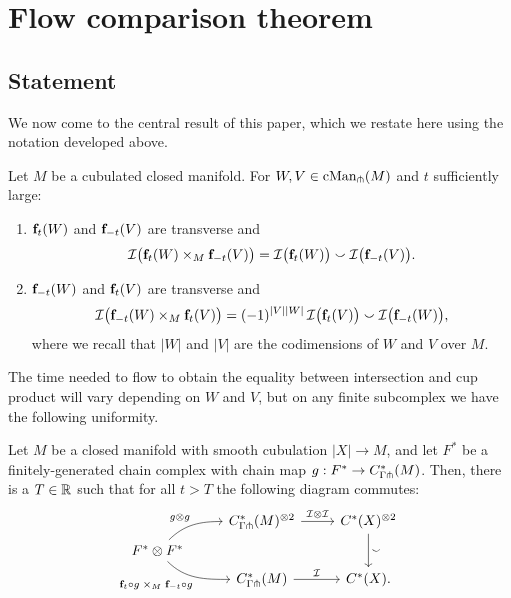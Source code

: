 
\section{Flow comparison theorem}\label{S: flow comparison theorem}

\subsection{Statement}

We now come to the central result of this paper, which we restate here using the notation developed above.

\begin{theorem}\label{T: main theorem}
	Let $M$ be a cubulated closed manifold.
	For $W, V \in \mathrm{cMan}_\pitchfork(M)$ and $t$ sufficiently large:
	\begin{enumerate}
		\item $\mathbf{f}_t(W)$ and $\mathbf{f}_{-t}(V)$ are transverse and
		\begin{equation*}
			\mathcal{I} \big( \mathbf{f}_t(W) \times_M \mathbf{f}_{-t}(V) \big) =
			\mathcal{I} \big( \mathbf{f}_t(W) \big) \smallsmile \mathcal{I} \big( \mathbf{f}_{-t}(V) \big).
		\end{equation*}
		\item $\mathbf{f}_{-t}(W)$ and $\mathbf{f}_t(V)$ are transverse and
		\begin{equation*}
			\mathcal{I} \big( \mathbf{f}_{-t}(W) \times_M \mathbf{f}_t(V) \big) =
			(-1)^{|V||W|} \, \mathcal{I} \big( \mathbf{f}_t(V) \big) \smallsmile \mathcal{I} \big( \mathbf{f}_{-t}(W) \big),
		\end{equation*}
		where we recall that $|W|$ and $|V|$ are the codimensions of $W$ and $V$ over $M$.
	\end{enumerate}
\end{theorem}

The time needed to flow to obtain the equality between intersection and cup product will vary depending on $W$ and $V$, but on any finite subcomplex we have the following uniformity.

\begin{corollary}\label{C: finite diagram}
	Let $M$ be a closed manifold with smooth cubulation $|X|\to M$, and let $F^*$ be a finitely-generated chain complex with chain map $g:F^*\to C^*_{\Gamma \pitchfork}(M)$.
	Then, there is a $T \in \mathbb{R}$ such that for all $t > T$ the following diagram commutes:
	\begin{equation*}
		\begin{tikzcd} [row sep=tiny]
			& C^*_{\Gamma \pf}(M)^{\otimes 2} \arrow[r, "\cI \otimes \cI"] & \cochains(X)^{\otimes 2} \arrow[dd, "\sms"] \\
			F^*\otimes F^* \arrow[ur, in=180, out=45,"g\otimes g"] \arrow[dr, in=180, out=-45, "\f_t \circ g \; \times_M \; \f_{-t} \circ g"']& & \\
			& C^*_{\Gamma \pf}(M) \arrow[r, "\cI"] & \cochains(X).
		\end{tikzcd}
	\end{equation*}
\end{corollary}

